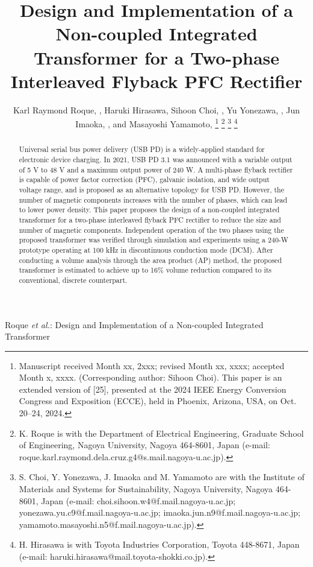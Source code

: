 \documentclass[lettersize,journal]{IEEEtran}
\begin{document}
\title{Design and Implementation of a Non-coupled Integrated Transformer for a Two-phase Interleaved Flyback PFC Rectifier}

\author{Karl Raymond Roque, , Haruki Hirasawa, Sihoon Choi, , Yu Yonezawa, , Jun Imaoka, , and Masayoshi Yamamoto, 
\thanks{Manuscript received Month xx, 2xxx; revised Month xx, xxxx; accepted Month x, xxxx. (Corresponding author: Sihoon Choi). This paper is an extended version of [25], presented at the 2024 IEEE Energy Conversion Congress and Exposition (ECCE), held in Phoenix, Arizona, USA, on Oct. 20–24, 2024.}
\thanks{K. Roque is with the Department of Electrical Engineering, Graduate School of Engineering, Nagoya University, Nagoya 464-8601, Japan (e-mail: roque.karl.raymond.dela.cruz.g4@s.mail.nagoya-u.ac.jp).}
\thanks{S. Choi, Y. Yonezawa, J. Imaoka and M. Yamamoto are with the Institute of Materials and Systems for Sustainability, Nagoya University, Nagoya 464-8601, Japan (e-mail: choi.sihoon.w4@f.mail.nagoya-u.ac.jp; yonezawa.yu.c9@f.mail.nagoya-u.ac.jp; imaoka.jun.n9@f.mail.nagoya-u.ac.jp; yamamoto.masayoshi.n5@f.mail.nagoya-u.ac.jp).}
\thanks{H. Hirasawa is with Toyota Industries Corporation, Toyota 448-8671, Japan (e-mail: haruki.hirasawa@mail.toyota-shokki.co.jp).}}

%
{Roque \MakeLowercase{\textit{et al.}}: Design and Implementation of a Non-coupled Integrated Transformer}

\maketitle

\begin{abstract}
Universal serial bus power delivery (USB PD) is a widely-applied standard for electronic device charging. In 2021, USB PD 3.1 was announced with a variable output of 5 V to 48 V and a maximum output power of 240 W. A multi-phase flyback rectifier is capable of power factor correction (PFC), galvanic isolation, and wide output voltage range, and is proposed as an alternative topology for USB PD. However, the number of magnetic components increases with the number of phases, which can lead to lower power density. This paper proposes the design of a non-coupled integrated transformer for a two-phase interleaved flyback PFC rectifier to reduce the size and number of magnetic components. Independent operation of the two phases using the proposed transformer was verified through simulation and experiments using a 240-W prototype operating at 100 kHz in discontinuous conduction mode (DCM). After conducting a volume analysis through the area product (AP) method, the proposed transformer is estimated to achieve up to 16\% volume reduction compared to its conventional, discrete counterpart.
\end{abstract}
\end{document}
